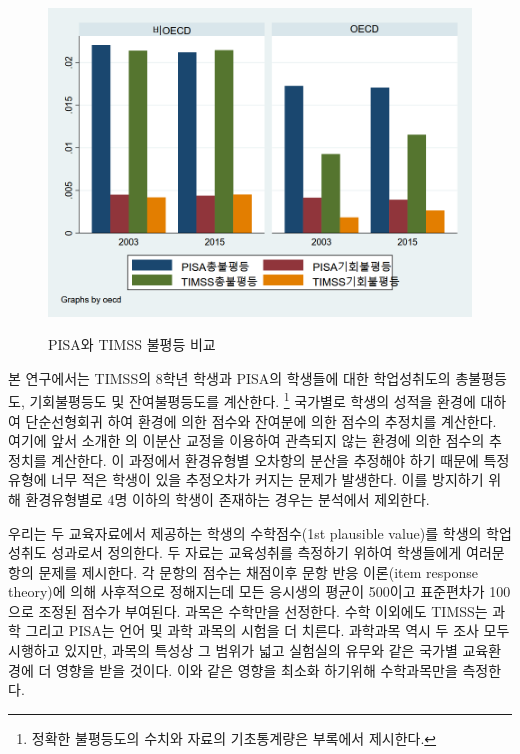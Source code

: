 \begin{figure}
    \centering
    \caption{PISA와 TIMSS 불평등 비교}
    \includegraphics[width=\textwidth]{figure/bar_pntcompare.png}
    \label{fig:bar_pntcompare}
\end{figure}

본 연구에서는 TIMSS의 8학년 학생과 PISA의 학생들에 대한 학업성취도의 총불평등도, 기회불평등도 및 잔여불평등도를 계산한다.
\footnote{정확한 불평등도의 수치와 자료의 기초통계량은 부록에서 제시한다.}
국가별로 학생의 성적을 환경에 대하여 단순선형회귀 하여 환경에 의한 점수와 잔여분에 의한 점수의 추정치를 계산한다. 
여기에 앞서 소개한 \citet{betl12}의 이분산 교정을 이용하여 관측되지 않는 환경에 의한 점수의 추정치를 계산한다.
이 과정에서 환경유형별 오차항의 분산을 추정해야 하기 때문에 특정 유형에 너무 적은 학생이 있을 추정오차가 커지는 문제가 발생한다.
이를 방지하기 위해 환경유형별로 4명 이하의 학생이 존재하는 경우는 분석에서 제외한다.

우리는 두 교육자료에서 제공하는 학생의 수학점수(1st plausible value)를 학생의 학업성취도 성과로서 정의한다.
두 자료는 교육성취를 측정하기 위하여 학생들에게 여러문항의 문제를 제시한다.
각 문항의 점수는 채점이후 문항 반응 이론(item response theory)에 의해 사후적으로 정해지는데 모든 응시생의 평균이 500이고 표준편차가 100으로 조정된 점수가 부여된다.
과목은 수학만을 선정한다. 수학 이외에도 TIMSS는 과학 그리고 PISA는 언어 및 과학 과목의 시험을 더 치른다. 과학과목 역시 두 조사 모두 시행하고 있지만, 과목의 특성상 그 범위가 넓고 실험실의 유무와 같은 국가별 교육환경에 더 영향을 받을 것이다. 이와 같은 영향을 최소화 하기위해 수학과목만을 측정한다. 
 
